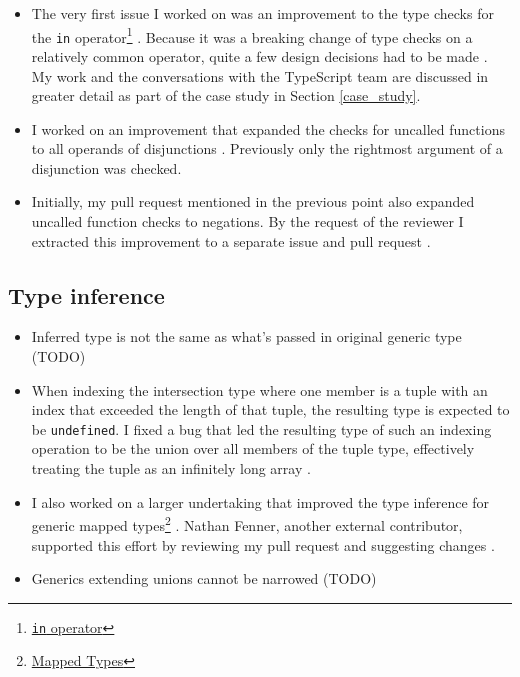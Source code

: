 \documentclass[12pt]{scrartcl}
\def\code#1{\texttt{\frenchspacing#1}}
\begin{document}
\begin{itemize}
    \item The very first issue I worked on was an improvement to the type checks for the \code{in} operator\footnote{\href{https://developer.mozilla.org/en-US/docs/Web/JavaScript/Reference/Operators/in}{\code{in} operator}} \cite{41317}. Because it was a breaking change of type checks on a relatively common operator, quite a few design decisions had to be made \cite{41928}. My work and the conversations with the TypeScript team are discussed in greater detail as part of the case study in Section \ref{case_study}.
    \item I worked on an improvement that expanded the checks for uncalled functions to all operands of disjunctions \cite{35584}\cite{42835}. Previously only the rightmost argument of a disjunction was checked.
    \item Initially, my pull request mentioned in the previous point also expanded uncalled function checks to negations. By the request of the reviewer \cite{42835Comment} I extracted this improvement to a separate issue \cite{43096} and pull request \cite{43097}.
\end{itemize}

\subsection{Type inference}

\begin{itemize}
    \item Inferred type is not the same as what's passed in original generic type (TODO)
    \item When indexing the intersection type where one member is a tuple with an index that exceeded the length of that tuple, the resulting type is expected to be \code{undefined}. I fixed a bug that led the resulting type of such an indexing operation to be the union over all members of the tuple type, effectively treating the tuple as an infinitely long array \cite{42557}\cite{42602}.
    \item I also worked on a larger undertaking that improved the type inference for generic mapped types\footnote{\href{https://www.typescriptlang.org/docs/handbook/2/mapped-types.html}{Mapped Types}} \cite{37670}\cite{42382}. Nathan Fenner, another external contributor, supported this effort by reviewing my pull request and suggesting changes \cite{42382Comment}.
    \item Generics extending unions cannot be narrowed (TODO)
\end{itemize}
\end{document}

